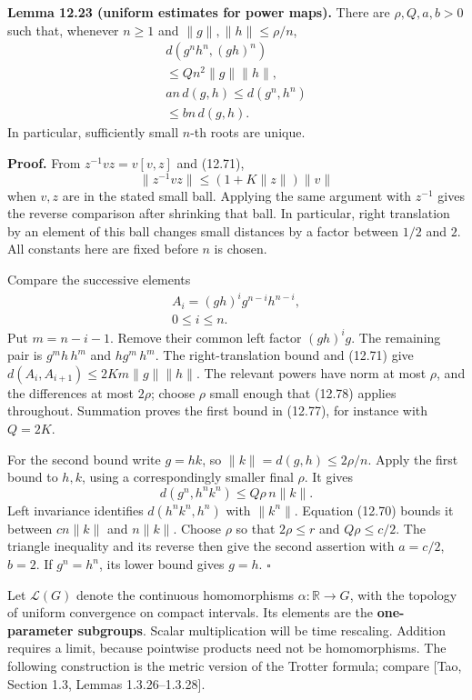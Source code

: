 \documentclass[
  11pt,
]{article}
\begin{document}
\textbf{Lemma 12.23 (uniform estimates for power maps).} There are
\(\rho,Q,a,b>0\) such that, whenever \(n\geq1\) and
\(\|g\|,\|h\|\leq\rho/n\), \[
\begin{gathered}
d(g^nh^n,(gh)^n)\\
\leq Qn^2\|g\|\|h\|,\\
an\,d(g,h)\leq d(g^n,h^n)\\
\leq bn\,d(g,h).
\end{gathered}
\tag{12.77}
\] In particular, sufficiently small \(n\)-th roots are unique.

\textbf{Proof.} From \(z^{-1}vz=v[v,z]\) and (12.71), \[
\|z^{-1}vz\|\leq(1+K\|z\|)\|v\|
\tag{12.78}
\] when \(v,z\) are in the stated small ball. Applying the same argument
with \(z^{-1}\) gives the reverse comparison after shrinking that ball.
In particular, right translation by an element of this ball changes
small distances by a factor between \(1/2\) and \(2\). All constants
here are fixed before \(n\) is chosen.

Compare the successive elements \[
\begin{gathered}
A_i=(gh)^i g^{n-i}h^{n-i},\\
0\leq i\leq n.
\end{gathered}
\tag{12.79}
\] Put \(m=n-i-1\). Remove their common left factor \((gh)^ig\). The
remaining pair is \(g^mh\,h^m\) and \(hg^m\,h^m\). The right-translation
bound and (12.71) give \(d(A_i,A_{i+1})\leq2K m\|g\|\|h\|\). The
relevant powers have norm at most \(\rho\), and the differences at most
\(2\rho\); choose \(\rho\) small enough that (12.78) applies throughout.
Summation proves the first bound in (12.77), for instance with \(Q=2K\).

For the second bound write \(g=hk\), so \(\|k\|=d(g,h)\leq2\rho/n\).
Apply the first bound to \(h,k\), using a correspondingly smaller final
\(\rho\). It gives \[
d(g^n,h^nk^n)\leq Q\rho\,n\|k\|.
\tag{12.80}
\] Left invariance identifies \(d(h^nk^n,h^n)\) with \(\|k^n\|\).
Equation (12.70) bounds it between \(cn\|k\|\) and \(n\|k\|\). Choose
\(\rho\) so that \(2\rho\leq r\) and \(Q\rho\leq c/2\). The triangle
inequality and its reverse then give the second assertion with
\(a=c/2\), \(b=2\). If \(g^n=h^n\), its lower bound gives \(g=h\).
\(\square\)

Let \(\mathcal L(G)\) denote the continuous homomorphisms
\(\alpha:\mathbb R\to G\), with the topology of uniform convergence on
compact intervals. Its elements are the \textbf{one-parameter
subgroups}. Scalar multiplication will be time rescaling. Addition
requires a limit, because pointwise products need not be homomorphisms.
The following construction is the metric version of the Trotter formula;
compare {[}Tao, Section 1.3, Lemmas 1.3.26--1.3.28{]}.
\end{document}
